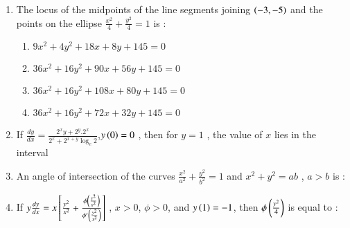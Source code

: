 \documentclass[journal]{IEEEtran}
\begin{document}
\begin{enumerate}[start=1]
\begin{enumerate}
\end{enumerate}
\item %
The locus of the midpoints of the line segments joining $\left(-3,-5\right)$ and the points on the ellipse $\frac{x^2}{4}+\frac{y^2}{4}=1$ is :
\begin{enumerate}
\item $9x^2 + 4y^2 + 18x + 8y + 145=0$
\item $36x^2 + 16y^2 +90x +56y +145=0$
\item $36x^2 + 16y^2 +108x +80y +145=0$
\item $36x^2 + 16y^2 +72x +32y +145=0$
\end{enumerate}
\item %
If $\frac{dy}{dx}= \frac{2^xy+2^y.2^x}{2^x+2^{x+y}\log_e 2}$,$y\left(0\right) = 0$ , then for $y=1$ , the value of $x$ lies in the interval 
\begin{enumerate}
\begin{multicols}{2}
\item $\brak{1,2}$
\item $(\frac{1}{2},1]$
\end{multicols}
\begin{multicols}{2}
\item $\brak{2,3}$
\item $(0,\frac{1}{2}]$
\end{multicols}
\end{enumerate}
\item %
An angle of intersection of the curves $\frac{x^2}{a^2}+\frac{y^2}{b^2}=1$ and $x^2+y^2=ab$ , $a > b$ is :
\begin{enumerate}
\end{enumerate}
\item %
If $y\frac{dy}{dx}=x{}\left[\frac{y^2}{x^2}+\frac{\phi\left(\frac{y^2}{x^2}\right)}{\phi'\left(\frac{y^2}{x^2}\right)}\right]$ , $x>0$, $\phi >0$, and $y\left(1\right)=-1$, then $\phi\left(\frac{y^2}{4}\right)$ is equal to :

\end{enumerate}
\end{document}
